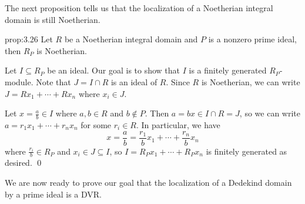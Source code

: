 The next proposition tells us that the localization of a Noetherian integral domain
is still Noetherian. 

\begin{prop}{prop:3.26}
    Let $R$ be a Noetherian integral domain and $P$ is a nonzero prime ideal, 
    then $R_P$ is Noetherian. 
\end{prop}\newpage
\begin{pf}
    Let $I \subseteq R_P$ be an ideal. Our goal is to show that 
    $I$ is a finitely generated $R_P$-module. Note that 
    $J = I \cap R$ is an ideal of $R$. Since $R$ is Noetherian, we can 
    write $J = Rx_1 + \cdots + Rx_n$ where $x_i \in J$. 
    
    Let $x = \frac{a}{b} \in I$ where $a, b \in R$ and $b \notin P$. Then 
    $a = bx \in I \cap R = J$, so we can write 
    $a = r_1 x_1 + \cdots + r_n x_n$ for some $r_i \in R$. In particular, 
    we have 
    \[ x = \frac{a}{b} = \frac{r_1}{b} x_1 + \cdots + \frac{r_n}{b} x_n \] 
    where $\frac{r_i}{b} \in R_P$ and $x_i \in J \subseteq I$, so 
    $I = R_P x_1 + \cdots + R_P x_n$ is finitely generated as desired. \qed
\end{pf}\vspace{-0.25cm}

We are now ready to prove our goal that the localization of a Dedekind 
domain by a prime ideal is a DVR. 

